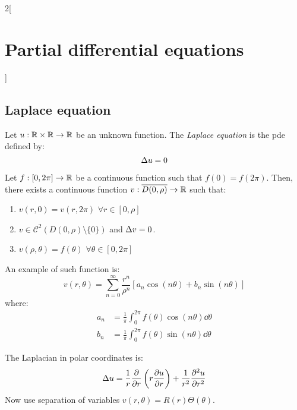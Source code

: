 \documentclass[../../../main_math.tex]{subfiles}
\begin{document}
\begin{multicols}{2}[\section{Partial differential equations}]
  \subsection{Laplace equation}
  \begin{definition}
    Let $u:\mathbb{R}\times\mathbb{R}\rightarrow\mathbb{R}$ be an unknown function. The \emph{Laplace equation} is the pde defined by: $$\Delta u=0$$
  \end{definition}
  \begin{proposition}
    Let $f:[0,2\pi]\rightarrow\mathbb{R}$ be a continuous function such that $f(0)=f(2\pi)$. Then, there exists a continuous function $v:\overline{D(0,\rho)}\rightarrow\mathbb{R}$ such that:
    \begin{enumerate}
      \item $v(r,0)=v(r,2\pi)$ $\forall r\in[0,\rho]$
      \item $v\in\mathcal{C}^2(D(0,\rho)\setminus\{0\})$ and $\Delta v=0$.
      \item $v(\rho,\theta)=f(\theta)$ $\forall\theta\in[0,2\pi]$
    \end{enumerate}
    An example of such function is:
    $$v(r,\theta)=\sum_{n=0}^\infty \frac{r^n}{\rho^n}\left[a_n\cos\left(n\theta\right)+ b_n\sin\left(n\theta\right)\right]$$ where:
    \begin{align*}
      a_n & =\frac{1}{\pi}\int_{0}^{2\pi} f(\theta)\cos\left(n\theta\right)\dd{\theta} \\
      b_n & =\frac{1}{\pi}\int_{0}^{2\pi} f(\theta)\sin\left(n\theta\right)\dd{\theta}
    \end{align*}
  \end{proposition}
  \begin{sproof}
    The Laplacian in polar coordinates is: $$\Delta u=\frac{1}{r}\pdv{}{r}\left(r\pdv{u}{r}\right)+\frac{1}{r^2}\pdv[2]{u}{r}$$ Now use separation of variables $v(r,\theta)=R(r)\Theta(\theta)$.
  \end{sproof}
\end{multicols}
\end{document}
